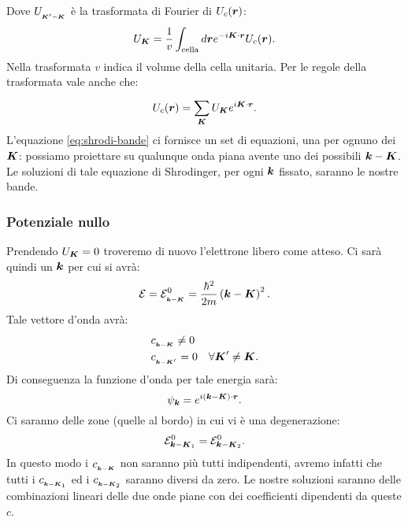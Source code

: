 Dove $U_{_{\boldsymbol{K}'-\boldsymbol{K}}}$ è la trasformata di Fourier di $U_{c}(\boldsymbol{r})$:
\[
	U_{\boldsymbol{K}} 
	= 
	\frac{1}{v}
	\int_{\text{cella}} d \boldsymbol{r} 
	e^{-i\boldsymbol{K}\cdot\boldsymbol{r}} U_c(\boldsymbol{r})
.\] 
Nella trasformata $v$ indica il volume della cella unitaria. Per le regole della trasformata vale anche che:
\[
	U_c(\boldsymbol{r}) = \sum_{\boldsymbol{K}}^{} U_{\boldsymbol{K}}e^{i\boldsymbol{K}\cdot\boldsymbol{r}}
.\] 
L'equazione \ref{eq:shrodi-bande} ci fornisce un set di equazioni, una per ognuno dei $\boldsymbol{K}$: possiamo proiettare su qualunque onda piana avente uno dei possibili $\boldsymbol{k}-\boldsymbol{K}$.
Le soluzioni di tale equazione di Shrodinger, per ogni $\boldsymbol{k}$ fissato, saranno le nostre bande. 
\subsubsection{Potenziale nullo}
\label{subsubsec:Potenziale nullo}
Prendendo $U_{\boldsymbol{K}} = 0$ troveremo di nuovo l'elettrone libero come atteso. Ci sarà quindi un $\boldsymbol{k}$ per cui si avrà:
\[
	\mathcal{E}  
	=
	\mathcal{E}^0_{_{\boldsymbol{k}-\boldsymbol{K}}} 
	=
	\frac{\hbar^2}{2m}\left( \boldsymbol{k}-\boldsymbol{K} \right)^2
.\] 
Tale vettore d'onda avrà:
\[\begin{aligned}
	&c_{_{\boldsymbol{k}-\boldsymbol{K}}}\neq 0 \\
	& c_{_{\boldsymbol{k}-\boldsymbol{K}'}} = 0 \quad \forall \boldsymbol{K}' \neq \boldsymbol{K}
.\end{aligned}\]
Di conseguenza la funzione d'onda per tale energia sarà:
\[
	\psi_{\boldsymbol{k}}=e^{i\left( \boldsymbol{k}-\boldsymbol{K} \right) \cdot\boldsymbol{r}}
.\] 
Ci saranno delle zone (quelle al bordo) in cui vi è una degenerazione:
\[
	\mathcal{E}^0_{\boldsymbol{k}-\boldsymbol{K}_1} = \mathcal{E}^0_{\boldsymbol{k}-\boldsymbol{K}_2}
.\] 
In questo modo i $c_{_{\boldsymbol{k}-\boldsymbol{K}}}$ non saranno più tutti indipendenti, avremo infatti che tutti i $c_{_{\boldsymbol{k}-\boldsymbol{K}_1}}$ ed i $c_{_{\boldsymbol{k}-\boldsymbol{K}_2}}$ saranno diversi da zero. Le nostre soluzioni saranno delle combinazioni lineari delle due onde piane con dei coefficienti dipendenti da queste $c$. 
